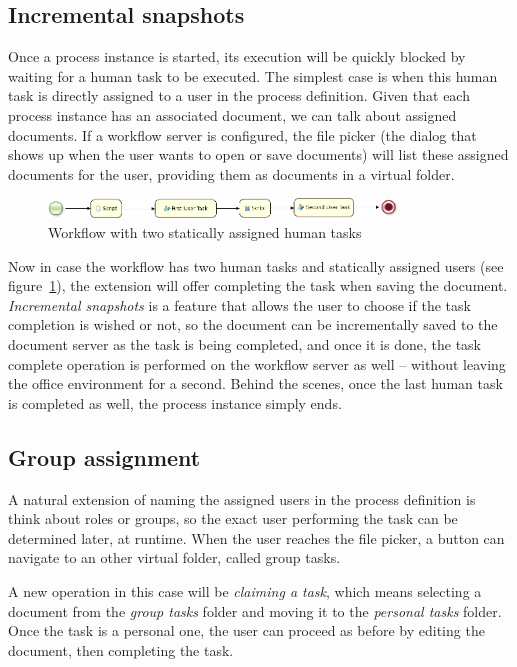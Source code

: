 \subsection*{Incremental snapshots}

Once a process instance is started, its execution will be quickly blocked by
waiting for a human task to be executed. The simplest case is when this human
task is directly assigned to a user in the process definition. Given that each
process instance has an associated document, we can talk about assigned
documents. If a workflow server is configured, the file picker (the dialog that
shows up when the user wants to open or save documents) will list these
assigned documents for the user, providing them as documents in a virtual
folder.

\begin{figure}[H]
\centering
\includegraphics[width=350px,keepaspectratio]{step-bpmn.png}
\caption{Workflow with two statically assigned human tasks}
\label{fig:step-bpmn}
\end{figure}

Now in case the workflow has two human tasks and statically assigned users (see
figure~\ref{fig:step-bpmn}), the extension will offer completing the task when saving the
document. \emph{Incremental snapshots} is a feature that allows the user to
choose if the task completion is wished or not, so the document can be
incrementally saved to the document server as the task is being completed, and
once it is done, the task complete operation is performed on the workflow
server as well -- without leaving the office environment for a second.  Behind
the scenes, once the last human task is completed as well, the process instance
simply ends.

\subsection*{Group assignment}

A natural extension of naming the assigned users in the process definition is
think about roles or groups, so the exact user performing the task can be
determined later, at runtime. When the user reaches the file picker, a button
can navigate to an other virtual folder, called group tasks.

A new operation in this case will be \emph{claiming a task}, which means
selecting a document from the \emph{group tasks} folder and moving it to the
\emph{personal tasks} folder. Once the task is a personal one, the user can
proceed as before by editing the document, then completing the task.

